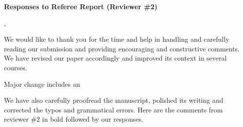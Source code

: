 \documentclass[twoside,11pt]{article}
\begin{document}
\begin{center}
{\Large \textbf{Responses to Referee Report (Reviewer \#2)}}
\end{center}

,

We would like to thank you for the time and help in handling and carefully reading our submission and providing encouraging and constructive comments.  We have revised our paper accordingly and improved its context in several courses. 

Major change includes an 

We have also carefully proofread the manuscript, polished its writing and corrected the typos and grammatical errors.  Here are the comments from reviewer \#2 in bold followed by our responses.
\end{document}
